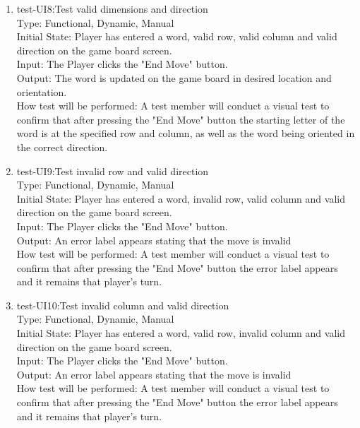 \documentclass[12pt, titlepage]{article}
\begin{document}
\begin{enumerate}
    \item{test-UI8:Test valid dimensions and direction\\} %
    Type: Functional, Dynamic, Manual\\
    Initial State: Player has entered a word, valid row, valid column and valid direction on the game board screen.\\
    Input: The Player clicks the "End Move" button.\\
    Output: The word is updated on the game board in desired location and orientation.\\
    How test will be performed: A test member will conduct a visual test to confirm that after pressing the "End Move" button the starting letter of the word is at the specified row and column, as well as the word being oriented in the correct direction.\\
    
    \item{test-UI9:Test invalid row and valid direction\\} %
    Type: Functional, Dynamic, Manual\\
    Initial State: Player has entered a word, invalid row, valid column and valid direction on the game board screen.\\
    Input: The Player clicks the "End Move" button.\\
    Output: An error label appears stating that the move is invalid \\
    How test will be performed: A test member will conduct a visual test to confirm that after pressing the "End Move" button the error label appears and it remains that player's turn.\\
    
    \item{test-UI10:Test invalid column and valid direction\\} %
    Type: Functional, Dynamic, Manual\\
    Initial State: Player has entered a word, valid row, invalid column and valid direction on the game board screen.\\
    Input: The Player clicks the "End Move" button.\\
    Output: An error label appears stating that the move is invalid \\
    How test will be performed: A test member will conduct a visual test to confirm that after pressing the "End Move" button the error label appears and it remains that player's turn.\\
    

\end{enumerate}
\end{document}
